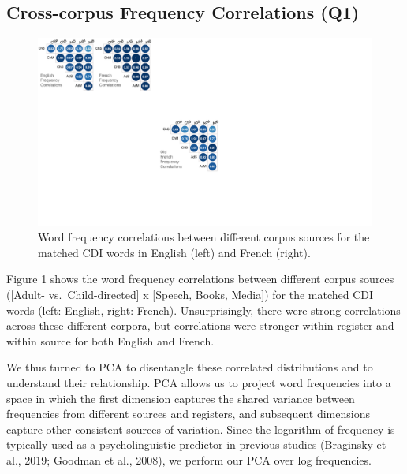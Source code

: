 \documentclass[10pt, letterpaper]{article}
\newenvironment{CodeChunk}{}{}
\begin{document}
\hypertarget{cross-corpus-frequency-correlations-q1}{%
\subsection{Cross-corpus Frequency Correlations
(Q1)}\label{cross-corpus-frequency-correlations-q1}}

\begin{CodeChunk}
\begin{figure}[t]

{\centering \includegraphics[width=\linewidth]{figs/corpus_freq_cors_hor} 

}

\caption[Word frequency correlations between different corpus sources for the matched CDI words in English (left) and French (right)]{Word frequency correlations between different corpus sources for the matched CDI words in English (left) and French (right).}\label{fig:fig1}
\end{figure}
\end{CodeChunk}

Figure 1 shows the word frequency correlations between different corpus
sources ({[}Adult- vs.~Child-directed{]} x {[}Speech, Books, Media{]})
for the matched CDI words (left: English, right: French).
Unsurprisingly, there were strong correlations across these different
corpora, but correlations were stronger within register and within
source for both English and French.

We thus turned to PCA to disentangle these correlated distributions and
to understand their relationship. PCA allows us to project word
frequencies into a space in which the first dimension captures the
shared variance between frequencies from different sources and
registers, and subsequent dimensions capture other consistent sources of
variation. Since the logarithm of frequency is typically used as a
psycholinguistic predictor in previous studies (Braginsky et al., 2019;
Goodman et al., 2008), we perform our PCA over log frequencies.
\end{document}
